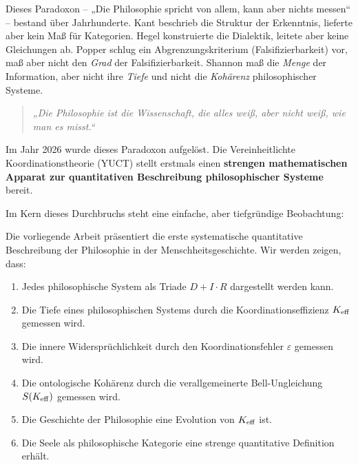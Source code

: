 \documentclass[12pt,a4paper]{article}
\newcommand{\eps}{\varepsilon}
\begin{document}
	Dieses Paradoxon – „Die Philosophie spricht von allem, kann aber nichts messen“ – bestand über Jahrhunderte. Kant beschrieb die Struktur der Erkenntnis, lieferte aber kein Maß für Kategorien. Hegel konstruierte die Dialektik, leitete aber keine Gleichungen ab. Popper schlug ein Abgrenzungskriterium (Falsifizierbarkeit) vor, maß aber nicht den \emph{Grad} der Falsifizierbarkeit. Shannon maß die \emph{Menge} der Information, aber nicht ihre \emph{Tiefe} und nicht die \emph{Kohärenz} philosophischer Systeme.
	
	\begin{quote}
		\textit{„Die Philosophie ist die Wissenschaft, die alles weiß, aber nicht weiß, wie man es misst.“}
	\end{quote}
	
	Im Jahr 2026 wurde dieses Paradoxon aufgelöst. Die Vereinheitlichte Koordinationstheorie (YUCT) stellt erstmals einen \textbf{strengen mathematischen Apparat zur quantitativen Beschreibung philosophischer Systeme} bereit.
	
	Im Kern dieses Durchbruchs steht eine einfache, aber tiefgründige Beobachtung:
	
	\begin{center}
	\end{center}
	
	Die vorliegende Arbeit präsentiert die erste systematische quantitative Beschreibung der Philosophie in der Menschheitsgeschichte. Wir werden zeigen, dass:
	
	\begin{enumerate}
		\item Jedes philosophische System als Triade \(D + I \cdot R\) dargestellt werden kann.
		\item Die Tiefe eines philosophischen Systems durch die Koordinationseffizienz \(\Keff\) gemessen wird.
		\item Die innere Widersprüchlichkeit durch den Koordinationsfehler \(\eps\) gemessen wird.
		\item Die ontologische Kohärenz durch die verallgemeinerte Bell-Ungleichung \(S(\Keff)\) gemessen wird.
		\item Die Geschichte der Philosophie eine Evolution von \(\Keff\) ist.
		\item Die Seele als philosophische Kategorie eine strenge quantitative Definition erhält.
	\end{enumerate}
	
\end{document}
